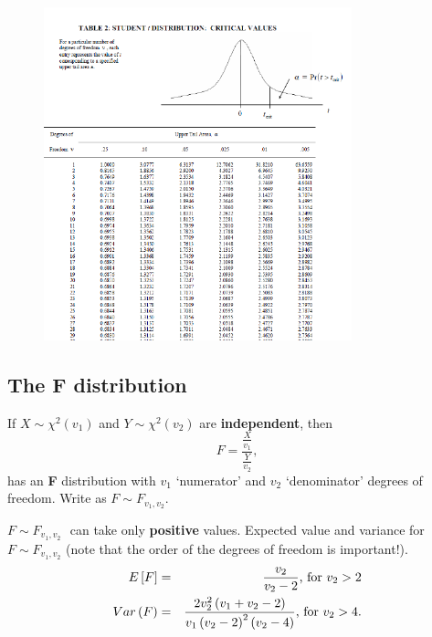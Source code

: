 \documentclass[notes=show,smaller,handout]{beamer}\usepackage[]{graphicx}\usepackage[]{color}
\begin{document}
\begin{frame}{\subsecname}

\begin{figure}[ptb]\centering
\includegraphics[height=3.8in, width=3.506in]{img/Student_t_table__5.pdf}%
\end{figure}

\end{frame}

\subsection{The F distribution}

\begin{frame}{\subsecname}
  \begin{definition}
  If $X\sim \chi ^{2}(v_{1})$ and $Y\sim \chi ^{2}(v_{2})$ are \textbf{%
  independent}, then%
  \begin{equation*}
  F=\frac{\frac{X}{v_{1}}}{\frac{Y}{v_{2}}},
  \end{equation*}%
  has an \textbf{F} distribution with $v_{1}$ `numerator' and $v_{2}$
  `denominator' degrees of freedom. Write as $F\sim F_{v_{1},v_{2}}$.
  \end{definition}

  $F\sim F_{v_{1},v_{2}}\,$\ can take only \textbf{positive }values. Expected value and variance for $F\sim F_{v_{1},v_{2}}$ (note that the order of the degrees of freedom is important!).
  \begin{eqnarray*}
  E\left[ F\right] &=&\frac{v_{2}}{v_{2}-2}\text{, for }v_{2}>2 \\
  Var\left( F\right) &=&\frac{2v_{2}^{2}\left( v_{1}+v_{2}-2\right) }{%
  v_{1}\left( v_{2}-2\right) ^{2}\left( v_{2}-4\right) }\text{, for }v_{2}>4.
  \end{eqnarray*}
\end{frame}
\end{document}
